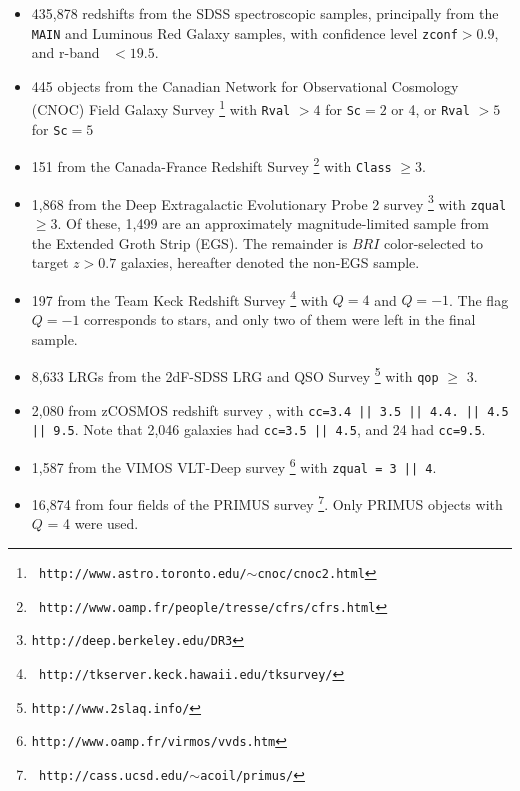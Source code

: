 \documentclass[12pt,preprint]{aastex}
\begin{document}
\begin{itemize} 

    \item 435,878 redshifts from the SDSS spectroscopic samples, principally
    from the \texttt{MAIN} \citep{Strauss02} and Luminous Red Galaxy
    \citep[\texttt{LRG};][]{Eisenstein01} samples, with confidence level
    \texttt{zconf}$ > 0.9$, and r-band \cmodelmag\ $ <19.5$.


    \item 445 objects from the Canadian Network for Observational Cosmology
    (CNOC) Field Galaxy Survey \cite[CNOC2;][]{yee00}\footnote{\tt
    http://www.astro.toronto.edu/$\sim$cnoc/cnoc2.html} with \texttt{Rval} $>4$
    for \texttt{Sc}$=2$ or 4, or \texttt{Rval} $> 5$ for \texttt{Sc}$=5$

    \item 151 from the Canada-France Redshift Survey
    \cite[CFRS;][]{lilly95}\footnote{\tt
    http://www.oamp.fr/people/tresse/cfrs/cfrs.html} with \texttt{Class} $\geq
    3$.

    \item 1,868 from the Deep Extragalactic Evolutionary Probe 2 survey
    \citep[DEEP2;][]{weiner05}\footnote{\tt http://deep.berkeley.edu/DR3} with
    \texttt{zqual} $\geq 3$.  Of these, 1,499 are an approximately
    magnitude-limited sample from the Extended Groth Strip (EGS).  The
    remainder is $BRI$ color-selected to target $z>0.7$ galaxies, hereafter
    denoted the non-EGS sample. 

    \item 197 from the Team Keck Redshift Survey
    \cite[TKRS;][]{wirth04}\footnote{\tt
    http://tkserver.keck.hawaii.edu/tksurvey/} with $Q=4$ and $Q=-1$.
    The flag $Q=-1$ corresponds to stars, and only two of them were left in the final
    sample.

    \item 8,633 LRGs from the 2dF-SDSS LRG and QSO Survey
    \cite[2SLAQ;][]{cannon06}\footnote{\tt http://www.2slaq.info/} with
    \texttt{qop} $\geq$ 3.

    \item  2,080 from zCOSMOS redshift survey \cite{lilly07}, with
    \texttt{cc=3.4 || 3.5 || 4.4.  || 4.5 || 9.5}. Note that 2,046 galaxies
    had \texttt{cc=3.5 || 4.5}, and 24 had \texttt{cc=9.5}. 
    
    
    \item 1,587 from the VIMOS VLT-Deep survey
    \cite[VVDS;][]{garilli08}\footnote{\tt http://www.oamp.fr/virmos/vvds.htm}
    with \texttt{zqual = 3 || 4}.

    \item 16,874 from four fields of the PRIMUS survey
    \cite[PRIMUS;][]{coil10,cool12}\footnote{\tt
    http://cass.ucsd.edu/$\sim$acoil/primus/}.  Only PRIMUS objects with $Q$ =
    4 were used.      \end{itemize}
\end{document}
